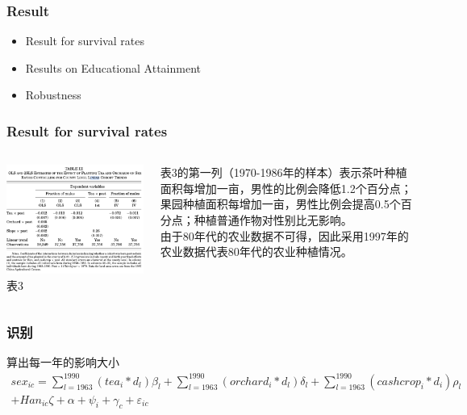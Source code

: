 \documentclass{beamer}
\begin{document}
\begin{frame}
    \frametitle{Result}
  \begin{itemize}
        \item Result for survival rates
        \item Results on Educational Attainment
        \item Robustness
    \end{itemize}  
\end{frame}


\begin{frame}
    \frametitle{Result for survival rates}
    \begin{columns}
            \begin{minipage}[c][0.4\textheight][c]{\linewidth}
                \centering
                \includegraphics[scale=0.3]{table3}
             表3
            \end{minipage}
            \begin{minipage}[c][0.4\textheight][c]{\linewidth}
            表3的第一列（1970-1986年的样本）表示茶叶种植面积每增加一亩，男性的比例会降低1.2个百分点；果园种植面积每增加一亩，男性比例会提高0.5个百分点；种植普通作物对性别比无影响。
            \\  由于80年代的农业数据不可得，因此采用1997年的农业数据代表80年代的农业种植情况。
            \end{minipage}
    \end{columns} 
\end{frame}
\begin{frame}
   \frametitle{识别}
  算出每一年的影响大小
    \begin{equation}
    \begin{aligned}
sex_{ic}= \sum_{l=1963}^{1990}(tea_i*d_l)\beta_l+\sum_{l=1963}^{1990}(orchard_i*d_l)\delta_l+\sum_{l=1963}^{1990}(cashcrop_i*d_i)\rho_l\\
+Han_{ic}\zeta +\alpha+\psi_i+\gamma_c+\varepsilon_{ic}
    \end{aligned}
    \end{equation}
\end{frame}
\end{document}
